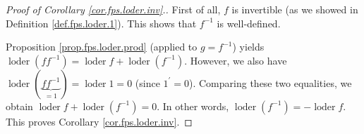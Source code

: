 \begin{proof}
[Proof of Corollary \ref{cor.fps.loder.inv}.]First of all, $f$ is invertible
(as we showed in Definition \ref{def.fps.loder.1}). This shows that $f^{-1}$
is well-defined.

Proposition \ref{prop.fps.loder.prod} (applied to $g=f^{-1}$) yields
$\operatorname*{loder}\left(  ff^{-1}\right)  =\operatorname*{loder}%
f+\operatorname*{loder}\left(  f^{-1}\right)  $. However, we also have
$\operatorname*{loder}\left(  \underbrace{ff^{-1}}_{=1}\right)
=\operatorname*{loder}1=0$ (since $1^{\prime}=0$). Comparing these two
equalities, we obtain $\operatorname*{loder}f+\operatorname*{loder}\left(
f^{-1}\right)  =0$. In other words, $\operatorname*{loder}\left(
f^{-1}\right)  =-\operatorname*{loder}f$. This proves Corollary
\ref{cor.fps.loder.inv}.
\end{proof}
